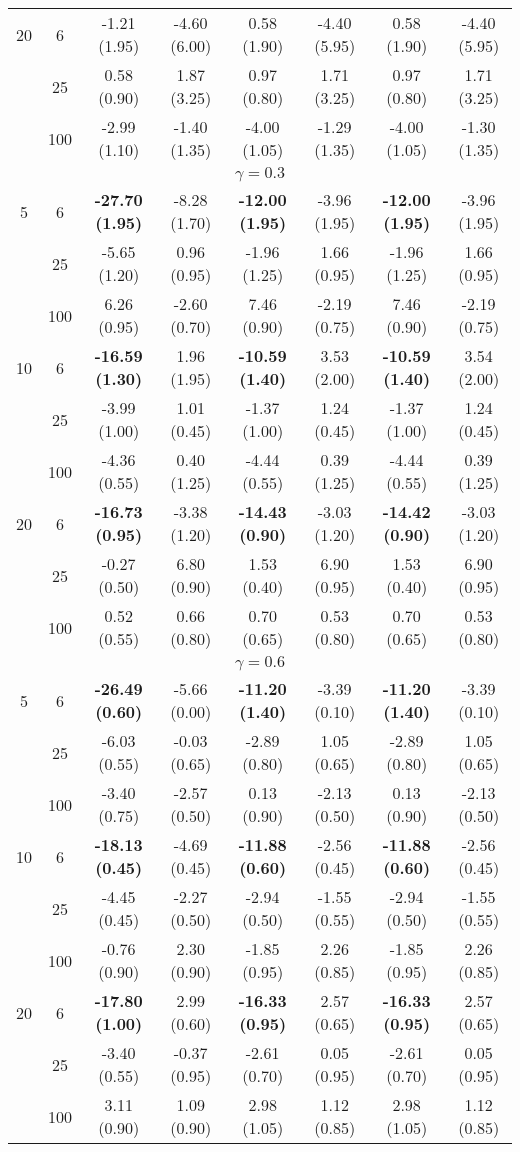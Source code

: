 \documentclass[
  man]{apa6}
\newenvironment{lltable}{\begin{landscape}\centering\begin{ThreePartTable}}{\end{ThreePartTable}\end{landscape}}
\begin{document}
\begin{lltable}
{\begin{longtable}{cccccccc}
20 & 6 & -1.21 (1.95) & -4.60 (6.00) & 0.58 (1.90) & -4.40 (5.95) & 0.58 (1.90) & -4.40 (5.95)\\
 & 25 & 0.58 (0.90) & 1.87 (3.25) & 0.97 (0.80) & 1.71 (3.25) & 0.97 (0.80) & 1.71 (3.25)\\
 & 100 & -2.99 (1.10) & -1.40 (1.35) & -4.00 (1.05) & -1.29 (1.35) & -4.00 (1.05) & -1.30 (1.35)\\
\multicolumn{8}{c}{$\gamma = 0.3$}\\
5 & 6 & \textbf{-27.70 (1.95)} & -8.28 (1.70) & \textbf{-12.00 (1.95)} & -3.96 (1.95) & \textbf{-12.00 (1.95)} & -3.96 (1.95)\\
 & 25 & -5.65 (1.20) & 0.96 (0.95) & -1.96 (1.25) & 1.66 (0.95) & -1.96 (1.25) & 1.66 (0.95)\\
 & 100 & 6.26 (0.95) & -2.60 (0.70) & 7.46 (0.90) & -2.19 (0.75) & 7.46 (0.90) & -2.19 (0.75)\\
10 & 6 & \textbf{-16.59 (1.30)} & 1.96 (1.95) & \textbf{-10.59 (1.40)} & 3.53 (2.00) & \textbf{-10.59 (1.40)} & 3.54 (2.00)\\
 & 25 & -3.99 (1.00) & 1.01 (0.45) & -1.37 (1.00) & 1.24 (0.45) & -1.37 (1.00) & 1.24 (0.45)\\
 & 100 & -4.36 (0.55) & 0.40 (1.25) & -4.44 (0.55) & 0.39 (1.25) & -4.44 (0.55) & 0.39 (1.25)\\
20 & 6 & \textbf{-16.73 (0.95)} & -3.38 (1.20) & \textbf{-14.43 (0.90)} & -3.03 (1.20) & \textbf{-14.42 (0.90)} & -3.03 (1.20)\\
 & 25 & -0.27 (0.50) & 6.80 (0.90) & 1.53 (0.40) & 6.90 (0.95) & 1.53 (0.40) & 6.90 (0.95)\\
 & 100 & 0.52 (0.55) & 0.66 (0.80) & 0.70 (0.65) & 0.53 (0.80) & 0.70 (0.65) & 0.53 (0.80)\\
\multicolumn{8}{c}{$\gamma = 0.6$}\\
5 & 6 & \textbf{-26.49 (0.60)} & -5.66 (0.00) & \textbf{-11.20 (1.40)} & -3.39 (0.10) & \textbf{-11.20 (1.40)} & -3.39 (0.10)\\
 & 25 & -6.03 (0.55) & -0.03 (0.65) & -2.89 (0.80) & 1.05 (0.65) & -2.89 (0.80) & 1.05 (0.65)\\
 & 100 & -3.40 (0.75) & -2.57 (0.50) & 0.13 (0.90) & -2.13 (0.50) & 0.13 (0.90) & -2.13 (0.50)\\
10 & 6 & \textbf{-18.13 (0.45)} & -4.69 (0.45) & \textbf{-11.88 (0.60)} & -2.56 (0.45) & \textbf{-11.88 (0.60)} & -2.56 (0.45)\\
 & 25 & -4.45 (0.45) & -2.27 (0.50) & -2.94 (0.50) & -1.55 (0.55) & -2.94 (0.50) & -1.55 (0.55)\\
 & 100 & -0.76 (0.90) & 2.30 (0.90) & -1.85 (0.95) & 2.26 (0.85) & -1.85 (0.95) & 2.26 (0.85)\\
20 & 6 & \textbf{-17.80 (1.00)} & 2.99 (0.60) & \textbf{-16.33 (0.95)} & 2.57 (0.65) & \textbf{-16.33 (0.95)} & 2.57 (0.65)\\
 & 25 & -3.40 (0.55) & -0.37 (0.95) & -2.61 (0.70) & 0.05 (0.95) & -2.61 (0.70) & 0.05 (0.95)\\
 & 100 & 3.11 (0.90) & 1.09 (0.90) & 2.98 (1.05) & 1.12 (0.85) & 2.98 (1.05) & 1.12 (0.85)\\
\bottomrule
\end{longtable}

}
\end{lltable}
\end{document}
